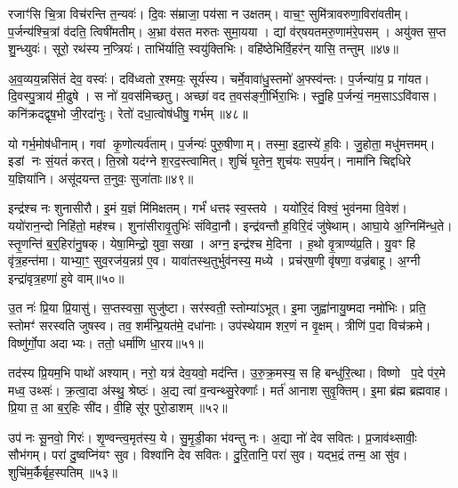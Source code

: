 रजाꣳ॑सि चि॒त्रा विच॑रन्ति त॒न्यवः॑।
दि॒वः स॑म्राजा॒ पय॑सा न उक्षतम्।
वाच॒ꣳ॒ सुमि॑त्रावरुणा॒विरा॑वतीम्।
प॒र्जन्य॑श्चि॒त्रां व॑दति॒ त्विषी॑मतीम्।
अ॒भ्रा व॑सत मरुतः सुमा॒यया।
द्यां व॑र्‌\mbox{}षयतमरु॒णाम॑रे॒पसम्।
अयु॑क्त स॒प्त शु॒न्ध्युवः॑।
सूरो॒ रथ॑स्य न॒प्त्रियः॑।
ताभि॑र्याति॒ स्वयु॑क्तिभिः।
वहि॑ष्ठेभिर्वि॒हर॑न् यासि॒ तन्तुम्॥४७॥

अ॒व॒व्यय॒न्नसि॑तं देव॒ वस्वः॑।
दवि॑ध्वतो र॒श्मयः॒ सूर्य॑स्य।
चर्मे॒वावा॑धु॒स्तमो॑ अ॒फ्स्व॑न्तः।
प॒र्जन्या॑य॒ प्र गा॑यत।
दि॒वस्पु॒त्राय॑ मी॒ढुषे।
स नो॑ य॒वस॑मिच्छतु।
अच्छा॑ वद त॒वस॑ङ्गी॒र्भिरा॒भिः।
स्तु॒हि प॒र्जन्यं॒ नम॒सा\-ऽऽवि॑वास।
कनि॑क्रदद्वृष॒भो जी॒रदा॑नुः।
रेतो॑ दधा॒त्वोष॑धीषु॒ गर्भम्॥४८॥

यो गर्भ॒मोष॑धीनाम्।
गवां कृ॒णोत्यर्व॑ताम्।
प॒र्जन्यः॑ पुरु॒षीणाम्।
तस्मा॒ इदा॒स्ये॑ ह॒विः।
जु॒होता॒ मधु॑मत्तमम्।
इडां नः सं॒यतं॑ करत्।
ति॒स्रो यद॑ग्ने श॒रद॒स्त्वामित्।
शुचिं॑ घृ॒तेन॒ शुच॑यः सप॒र्यन्।
नामा॑नि चिद्दधिरे य॒ज्ञिया॑नि।
असू॑दयन्त त॒नुवः॒ सुजा॑ताः॥४९॥

इन्द्र॑श्च नः शुनासीरौ।
इ॒मं य॒ज्ञं मि॑मिक्षतम्।
गर्भं॑ धत्तꣴ स्व॒स्तये।
ययो॑रि॒दं विश्वं॒ भुव॑नमा वि॒वेश॑।
ययो॑रान॒न्दो निहि॑तो॒ मह॑श्च।
शुना॑सीरावृ॒तुभिः॑ संविदा॒नौ।
इन्द्र॑वन्तौ ह॒विरि॒दं जु॑षेथाम्।
आघा॒ये अ॒ग्निमि॑न्ध॒ते।
स्तृ॒णन्ति॑ ब॒र्॒हिरा॑नु॒षक्।
येषा॒मिन्द्रो॒ युवा॒ सखा।
अग्न॒ इन्द्र॑श्च मे॒दिना।
ह॒थो वृ॒त्राण्य॑प्र॒ति।
यु॒वꣳ हि वृ॑त्र॒हन्त॑मा।
याभ्या॒ꣳ॒ सुव॒रज॑य॒न्नग्र॑ ए॒व।
यावा॑तस्थ॒तुर्भुव॑नस्य॒ मध्ये।
प्रच॑र्‌\mbox{}ष॒णी वृ॑षणा॒ वज्र॑बाहू।
अ॒ग्नी इन्द्रा॑वृत्र॒हणा॑ हुवे वाम्॥५०॥\anuvakamend[मन॒ इन्द्रो॒ गवि॑ष्टिषु॒ तन्तु॒ङ्गर्भ॒ꣳ॒ सुजा॑ताः॒ सखा॑ स॒प्त च॑]

उ॒त नः॑ प्रि॒या प्रि॒यासु॑।
स॒प्तस्वसा॒ सुजु॑ष्टा।
सर॑स्वती॒ स्तोम्या॑\-ऽभूत्।
इ॒मा जुह्वा॑नायु॒ष्मदा नमो॑भिः।
प्रति॒ स्तोमꣳ॑ सरस्वति जुषस्व।
तव॒ शर्म॑न्प्रि॒यत॑मे॒ दधा॑नाः।
उप॑स्थेयाम शर॒णं न वृ॒क्षम्।
त्रीणि॑ प॒दा विच॑क्रमे।
विष्णु॑र्गो॒पा अदाभ्यः।
ततो॒ धर्मा॑णि धा॒रय\sn{}॥५१॥

तद॑स्य प्रि॒यम॒भि पाथो॑ अश्याम्।
नरो॒ यत्र॑ देव॒यवो॒ मद॑न्ति।
उ॒रु॒क्र॒मस्य॒ स हि बन्धु॑रि॒त्था।
विष्णो प॒दे प॑र॒मे मध्व॒ उथ्सः॑।
क्र॒त्वा॒दा अ॑स्थु॒ श्रेष्ठः॑।
अ॒द्य त्वा॑ व॒न्वन्थ्सु॒रेक्णाः᳚।
मर्त॑ आनाश सुवृ॒क्तिम्।
इ॒मा ब्र॑ह्म ब्रह्मवाह।
प्रि॒या त॒ आ ब॒र्॒हिः सी॑द।
वी॒हि सू॑र पुरो॒डाशम्॥५२॥

उप॑ नः सू॒नवो॒ गिरः॑।
शृ॒ण्वन्त्व॒मृत॑स्य॒ ये।
सु॒मृ॒डी॒का भ॑वन्तु नः।
अ॒द्या नो॑ देव सवितः।
प्र॒जाव॑थ्सावीः॒ सौभ॑गम्।
परा॑ दु॒ष्वप्नि॑यꣳ सुव।
विश्वा॑नि देव सवितः।
दु॒रि॒तानि॒ परा॑ सुव।
यद्भ॒द्रं तन्म॒ आ सु॑व।
शुचि॑म॒र्कैर्बृह॒स्पतिम्॥५३॥

